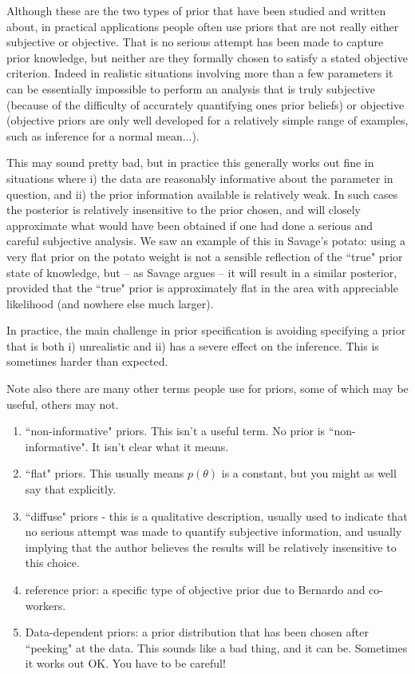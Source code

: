\documentclass[12pt]{article}
\begin{document}
Although these are the two types of prior that have been studied and written about, in practical applications people often use priors that are not really either
subjective or objective. That is no serious attempt has been made to capture prior knowledge, but neither are they formally chosen to satisfy a stated objective criterion.
Indeed in realistic situations involving more than a few parameters it can be essentially impossible to perform an analysis that is truly subjective (because
of the difficulty of accurately quantifying ones prior beliefs) or objective
 (objective priors are only well developed for a relatively simple range of examples, such as inference for a normal mean...).

This may sound pretty bad, but in practice this generally works out fine in situations where i) the data are reasonably informative about the parameter in question, and ii) the prior information
available is relatively weak. In such cases the posterior is relatively insensitive to the prior chosen, and will closely approximate
what would have been obtained if one had done a serious and careful subjective analysis. 
We saw an example of this in Savage's potato: using a very flat prior on the potato weight is not a sensible reflection of the ``true" prior state of knowledge, but -- as Savage argues -- it will result in a similar posterior, provided that the ``true" prior is approximately flat in the area with appreciable likelihood (and nowhere else much larger). 

In practice, the main challenge in prior specification is avoiding specifying a prior that is both i) unrealistic and ii) has a severe effect on the inference.
This is sometimes harder than expected. 

Note also there are many other terms people use for priors, some of which may be useful, others may not.
\begin{enumerate}
\item ``non-informative" priors. This isn't a useful term. No prior is ``non-informative". It isn't clear what it means. 
\item ``flat" priors. This usually means $p(\theta)$ is a constant, but you might as well say that explicitly.
\item ``diffuse" priors - this is a qualitative description, usually used to indicate that no serious attempt was made to
quantify subjective information, and usually implying that the author believes the results will be relatively insensitive to this choice.
\item reference prior: a specific type of objective prior due to Bernardo and co-workers.
\item Data-dependent priors: a prior distribution that has been chosen
after ``peeking" at the data. This sounds like a bad thing, and it can be. Sometimes it works out OK. You have to be careful!
\end{enumerate}
\end{document}
